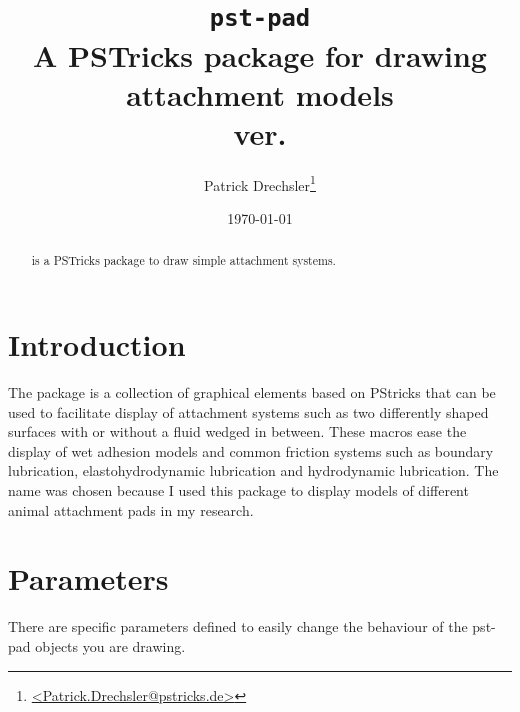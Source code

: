 \documentclass{scrartcl}
\newcommand{\summary}{A PSTricks package for drawing attachment models}
\begin{document}
\EnableQuotes

\title{\texttt{pst-pad}\\\summary\\\normalsize ver. \verPstPad} \author{Patrick
  Drechsler\thanks{\url{<Patrick.Drechsler@pstricks.de>}}} \date{\today}
\maketitle

\begin{abstract}
\PadPackage{} is a PSTricks package to draw simple attachment systems.
\end{abstract}

\setlength{\columnseprule}{0.6pt}
\begin{multicols}{2}
{\parskip 0pt \tableofcontents}
\end{multicols}

\section{Introduction}
\label{sec:introduction}

The package \PadPackage{} is a collection of graphical elements based on
PStricks that can be used to facilitate display of attachment systems such as
two differently shaped surfaces with or without a fluid wedged in
between. These macros ease the display of wet adhesion models and common
friction systems such as boundary lubrication, elastohydrodynamic lubrication
and hydrodynamic lubrication. The name \PadPackage{} was chosen because I used
this package to display models of different animal attachment pads in my
research.

\section{Parameters}
\label{sec:parameters}

There are specific parameters defined to easily change the behaviour of the pst-pad
objects you are drawing.
\end{document}
